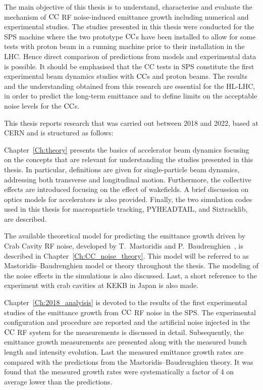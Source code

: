 The main objective of this thesis is to understand, characterise and evaluate the mechanism of ${\mathrm{CC}}$ RF noise-induced emittance growth including numerical and experimental studies. The studies presented in this thesis were conducted for the SPS machine where the two prototype ${\mathrm{CC}}$s have been installed to allow for some tests with proton beam in a running machine prior to their installation in the LHC. Hence direct comparison of predictions from models and experimental data is possible. 
It should be emphasised that the CC tests in SPS constitute the first experimental beam dynamics studies with ${\mathrm{CC}}$s and proton beams. The results and the understanding obtained from this research are essential for the HL-LHC, in order to predict the long-term emittance and to define limits on the acceptable noise levels for the ${\mathrm{CC}}$s.

This thesis reports research that was carried out between 2018 and 2022, based at CERN and is structured as follows:

Chapter~\ref{Ch:theory} presents the basics of accelerator beam dynamics focusing on the concepts that are relevant for understanding the studies presented in this thesis. In particular, definitions are given for single-particle beam dynamics, addressing both transverse and longitudinal motion. Furthermore, the collective effects are introduced focusing on the effect of wakefields. A brief discussion on optics models for accelerators is also provided. Finally, the two simulation codes used in this thesis for macroparticle tracking, PYHEADTAIL, and Sixtracklib, are described.

The available theoretical model for predicting the emittance growth driven by Crab Cavity RF noise, developed by T.~Mastoridis and P.~Baudrenghien~\cite{PhysRevSTAB.18.101001}, is described in Chapter~\ref{Ch:CC_noise_theory}. This model will be referred to as Mastoridis--Baudrenghien model or theory throughout the thesis. The modeling of the noise effects in the simulations is also discussed. Last, a short reference to the experiment with crab cavities at KEKB in Japan is also made. 

Chapter~\ref{Ch:2018_analyisis} is devoted to the results of the first experimental studies of the emittance growth from ${\mathrm{CC}}$ RF noise in the SPS. The experimental configuration and procedure are reported and the artificial noise injected in the ${\mathrm{CC}}$ RF system for the measurements is discussed in detail. Subsequently, the emittance growth measurements are presented along with the measured bunch length and intensity evolution. Last the measured emittance growth rates are compared with the predictions from the Mastoridis--Baudrenghien theory. It was found that the measured growth rates were systematically a factor of 4 on average lower than the predictions. 

